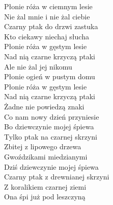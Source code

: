 \begin{text}
    Płonie róża w ciemnym lesie\\
    Nie żal mnie i nie żal ciebie\\
    Czarny ptak do drzwi zastuka\\
    Kto ciekawy niechaj słucha\\
    Płonie róża w gęstym lesie\\
    Nad nią czarne krzyczą ptaki\\
    Ale nie żal jej nikomu\\
    Płonie ogień w pustym domu\\
    Płonie róża w gęstym lesie\\
    Nad nią czarne krzyczą ptaki\\
    Żadne nie powiedzą znaki\\
    Co nam nowy dzień przyniesie\\
    Bo dziewczynie mojej śpiewa\\
    Tylko ptak na czarnej skrzyni\\
    Zbitej z lipowego drzewa\\
    Gwoździkami miedzianymi\\
    Dziś dziewczynie mojej śpiewa\\
    Czarny ptak z drewnianej skrzyni\\
    Z koralikiem czarnej ziemi\\
    Ona śpi już pod leszczyną
\end{text}
\begin{chord}

\end{chord}
